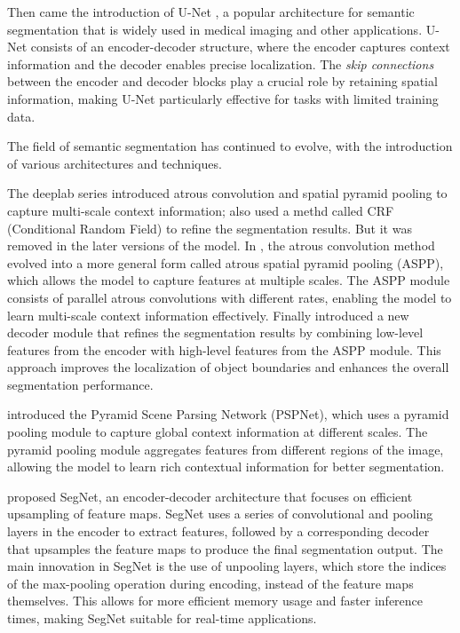 Then came the introduction of U-Net \cite{fsss_unet}, a popular architecture for semantic segmentation that is widely used in medical imaging and other applications. U-Net consists of an encoder-decoder structure, where the encoder captures context information and the decoder enables precise localization. The \emph{skip connections} between the encoder and decoder blocks play a crucial role by retaining spatial information, making U-Net particularly effective for tasks with limited training data.

The field of semantic segmentation has continued to evolve, with the introduction of various architectures and techniques.

The deeplab series \cite{fsss_deeplabv1, fsss_deeplabv2, fsss_deeplabv3,fsss_deeplabv3plus} introduced atrous convolution and spatial pyramid pooling to capture multi-scale context information; \cite{fsss_deeplabv1} also used a methd called CRF (Conditional Random Field) to refine the segmentation results. But it was removed in the later versions of the model. In \cite{fsss_deeplabv2}, the atrous convolution method evolved into a more general form called atrous spatial pyramid pooling (ASPP), which allows the model to capture features at multiple scales. The ASPP module consists of parallel atrous convolutions with different rates, enabling the model to learn multi-scale context information effectively. Finally \cite{fsss_deeplabv3plus} introduced a new decoder module that refines the segmentation results by combining low-level features from the encoder with high-level features from the ASPP module. This approach improves the localization of object boundaries and enhances the overall segmentation performance.

\cite{fsss_pspnet} introduced the Pyramid Scene Parsing Network (PSPNet), which uses a pyramid pooling module to capture global context information at different scales. The pyramid pooling module aggregates features from different regions of the image, allowing the model to learn rich contextual information for better segmentation.

\cite{fsss_segnet} proposed SegNet, an encoder-decoder architecture that focuses on efficient upsampling of feature maps. SegNet uses a series of convolutional and pooling layers in the encoder to extract features, followed by a corresponding decoder that upsamples the feature maps to produce the final segmentation output. The main innovation in SegNet is the use of unpooling layers, which store the indices of the max-pooling operation during encoding, instead of the feature maps themselves. This allows for more efficient memory usage and faster inference times, making SegNet suitable for real-time applications.

